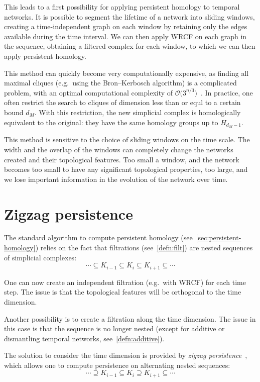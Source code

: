\documentclass[a4paper,11pt,openany,extrafontsizes]{memoir}
\begin{document}
This leads to a first possibility for applying persistent homology to
temporal networks. It is possible to segment the lifetime of a network
into sliding windows, creating a time-independent graph on each window
by retaining only the edges available during the time interval. We can
then apply WRCF on each graph in the sequence, obtaining a filtered
complex for each window, to which we can then apply persistent
homology.

This method can quickly become very computationally expensive, as
finding all maximal cliques (e.g.\ using the Bron--Kerbosch algorithm)
is a complicated problem, with an optimal computational complexity of
$\mathcal{O}\big(3^{n/3}\big)$~\cite{tomita_worst-case_2006}. In
practice, one often restrict the search to cliques of dimension less
than or equl to a certain bound $d_M$. With this restriction, the new
simplicial complex is homologically equivalent to the original: they
have the same homology groups up to $H_{d_M-1}$.

This method is sensitive to the choice of sliding windows on the time
scale. The width and the overlap of the windows can completely change
the networks created and their topological features. Too small a
window, and the network becomes too small to have any significant
topological properties, too large, and we lose important information
in the evolution of the network over time.

\section{Zigzag persistence}%
\label{sec:zigzag-persistence}

The standard algorithm to compute persistent homology
(see~\autoref{sec:persistent-homology}) relies on the fact that
filtrations (see~\autoref{defn:filt}) are nested sequences of
simplicial complexes:
\[ \cdots \subseteq K_{i-1} \subseteq K_i \subseteq K_{i+1} \subseteq
  \cdots \]

One can now create an independent filtration (e.g.\ with WRCF) for
each time step. The issue is that the topological features will be
orthogonal to the time dimension.

Another possibility is to create a filtration along the time
dimension. The issue in this case is that the sequence is no longer
nested (except for additive or dismantling temporal networks,
see~\autoref{defn:additive}).

The solution to consider the time dimension is provided by
\emph{zigzag persistence}~\cite{carlsson_zigzag_2009}, which allows
one to compute persistence on alternating nested sequences:
\[ \cdots \supseteq K_{i-1} \subseteq K_i \supseteq K_{i+1} \subseteq
  \cdots \]
\end{document}
